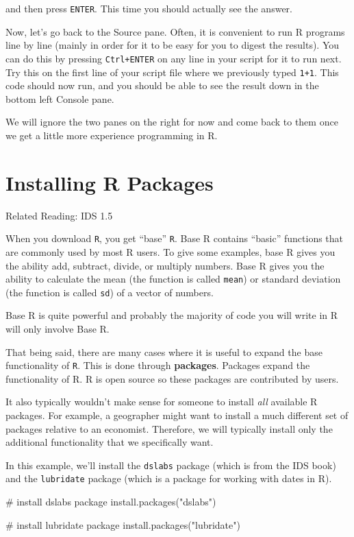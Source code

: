 \documentclass[
  letterpaper,
  DIV=11,
  numbers=noendperiod]{scrreprt}
\newenvironment{Shaded}{\begin{snugshade}}{\end{snugshade}}
\newcommand{\CommentTok}[1]{\textcolor[rgb]{0.37,0.37,0.37}{#1}}
\newcommand{\FunctionTok}[1]{\textcolor[rgb]{0.28,0.35,0.67}{#1}}
\newcommand{\NormalTok}[1]{\textcolor[rgb]{0.00,0.23,0.31}{#1}}
\newcommand{\StringTok}[1]{\textcolor[rgb]{0.13,0.47,0.30}{#1}}
\begin{document}
and then press \texttt{ENTER}. This time you should actually see the
answer.

Now, let's go back to the Source pane. Often, it is convenient to run R
programs line by line (mainly in order for it to be easy for you to
digest the results). You can do this by pressing \texttt{Ctrl+ENTER} on
any line in your script for it to run next. Try this on the first line
of your script file where we previously typed \texttt{1+1}. This code
should now run, and you should be able to see the result down in the
bottom left Console pane.

We will ignore the two panes on the right for now and come back to them
once we get a little more experience programming in R.

\section{Installing R Packages}\label{installing-r-packages}

Related Reading: IDS 1.5

When you download \texttt{R}, you get ``base'' \texttt{R}. Base R
contains ``basic'' functions that are commonly used by most R users. To
give some examples, base R gives you the ability add, subtract, divide,
or multiply numbers. Base R gives you the ability to calculate the mean
(the function is called \texttt{mean}) or standard deviation (the
function is called \texttt{sd}) of a vector of numbers.

Base R is quite powerful and probably the majority of code you will
write in R will only involve Base R.

That being said, there are many cases where it is useful to expand the
base functionality of \texttt{R}. This is done through
\textbf{packages}. Packages expand the functionality of R. R is open
source so these packages are contributed by users.

It also typically wouldn't make sense for someone to install \emph{all}
available R packages. For example, a geographer might want to install a
much different set of packages relative to an economist. Therefore, we
will typically install only the additional functionality that we
specifically want.

In this example, we'll install the \texttt{dslabs} package (which is
from the IDS book) and the \texttt{lubridate} package (which is a
package for working with dates in R).

\begin{Shaded}
\begin{Highlighting}[]
\CommentTok{\# install dslabs package}
\FunctionTok{install.packages}\NormalTok{(}\StringTok{"dslabs"}\NormalTok{)}

\CommentTok{\# install lubridate package}
\FunctionTok{install.packages}\NormalTok{(}\StringTok{"lubridate"}\NormalTok{)}
\end{Highlighting}
\end{Shaded}
\end{document}

